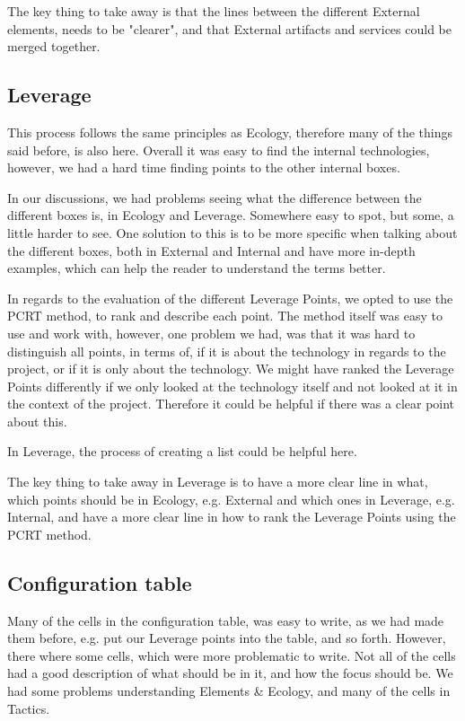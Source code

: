 The key thing to take away is that the lines between the different External elements, needs to be "clearer", and that External artifacts and services could be merged together.

\subsection{Leverage}
This process follows the same principles as Ecology, therefore many of the things said before, is also here.
Overall it was easy to find the internal technologies, however, we had a hard time finding points to the other internal boxes.

In our discussions, we had problems seeing what the difference between the different boxes is, in Ecology and Leverage.
Somewhere easy to spot, but some, a little harder to see.
One solution to this is to be more specific when talking about the different boxes, both in External and Internal and have more in-depth examples, which can help the reader to understand the terms better.

In regards to the evaluation of the different Leverage Points, we opted to use the PCRT method, to rank and describe each point.
The method itself was easy to use and work with, however, one problem we had, was that it was hard to distinguish all points, in terms of, if it is about the technology in regards to the project, or if it is only about the technology.
We might have ranked the Leverage Points differently if we only looked at the technology itself and not looked at it in the context of the project.
Therefore it could be helpful if there was a clear point about this.

In Leverage, the process of creating a list could be helpful here.

The key thing to take away in Leverage is to have a more clear line in what, which points should be in Ecology, e.g. External and which ones in Leverage, e.g. Internal, and have a more clear line in how to rank the Leverage Points using the PCRT method.

\subsection{Configuration table}
Many of the cells in the configuration table, was easy to write, as we had made them before, e.g. put our Leverage points into the table, and so forth.
However, there where some cells, which were more problematic to write.
Not all of the cells had a good description of what should be in it, and how the focus should be.
We had some problems understanding Elements \& Ecology, and many of the cells in Tactics.

